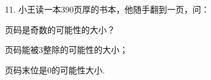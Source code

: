 11.	小王读一本390页厚的书本，他随手翻到一页，问：

\begin{subquestions}

    \subquestion 页码是奇数的可能性的大小？

    \subquestion 页码能被3整除的可能性的大小；

    \subquestion 页码末位是0的可能性大小.

\end{subquestions}





